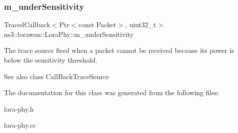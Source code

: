 \subsubsection{\texorpdfstring{m\+\_\+under\+Sensitivity}{m\_underSensitivity}}
{\footnotesize\ttfamily Traced\+Callback$<$Ptr$<$const Packet$>$, uint32\+\_\+t$>$ ns3\+::lorawan\+::\+Lora\+Phy\+::m\+\_\+under\+Sensitivity\hspace{0.3cm}{\ttfamily [protected]}}

The trace source fired when a packet cannot be received because its power is below the sensitivity threshold.

\begin{DoxySeeAlso}{See also}
class Call\+Back\+Trace\+Source 
\end{DoxySeeAlso}


The documentation for this class was generated from the following files\+:\begin{DoxyCompactItemize}
\item 
lora-\/phy.\+h\item 
lora-\/phy.\+cc\end{DoxyCompactItemize}
